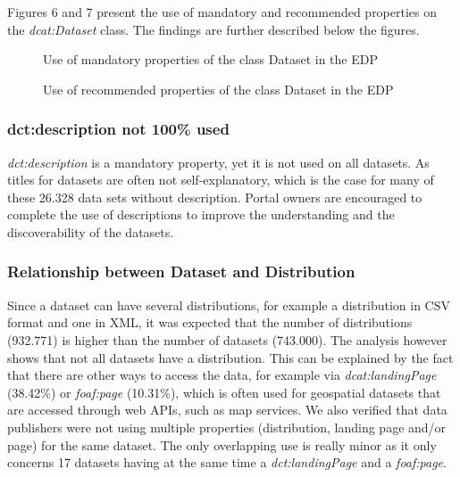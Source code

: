 \documentclass[<options>]{elsarticle}
\begin{document}
Figures 6 and 7 present the use of mandatory and recommended properties on the \textit{dcat:Dataset} class. The findings are further described below the figures.
\begin{figure}[H]
\caption{Use of mandatory properties of the class Dataset in the EDP}
\caption{Use of recommended properties of the class Dataset in the EDP}
\end{figure}


\subsubsection*{dct:description not 100\% used}
\textit{dct:description} is a mandatory property, yet it is not used on all datasets. As titles for datasets are often not self-explanatory, which is the case for many of these  26.328 data sets without description. Portal owners are encouraged to complete the use of descriptions to improve the understanding and the discoverability of the datasets.

\subsubsection*{Relationship between Dataset and Distribution}
Since a dataset can have several distributions, for example a distribution in CSV format and one in XML, it was expected that the number of distributions (932.771) is higher than the number of datasets (743.000). The analysis however shows that not all datasets have a distribution. This can be explained by the fact that there are other ways to access the data, for example via \textit{dcat:landingPage} (38.42\%) or \textit{foaf:page} (10.31\%), which is often used for geospatial datasets that are accessed through web APIs, such as map services.  We also verified that data publishers were not using multiple properties (distribution, landing page and/or page) for the same dataset. The only overlapping use is really minor as it only concerns 17 datasets having at the same time a \textit{dct:landingPage} and a \textit{foaf:page}.
\end{document}
